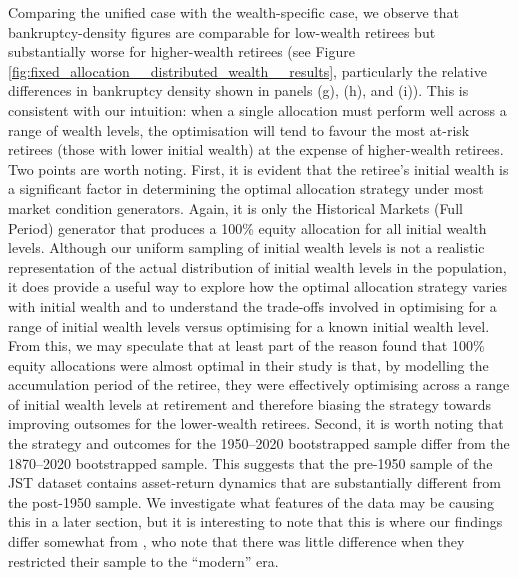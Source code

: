 \documentclass[11pt]{article}
\begin{document}
Comparing the unified case with the wealth-specific case, we observe that bankruptcy-density figures are comparable for low-wealth retirees but substantially worse for higher-wealth retirees (see Figure \ref{fig:fixed_allocation__distributed_wealth__results}, particularly the relative differences in bankruptcy density shown in panels (g), (h), and (i)). This is consistent with our intuition: when a single allocation must perform well across a range of wealth levels, the optimisation will tend to favour the most at-risk retirees (those with lower initial wealth) at the expense of higher-wealth retirees. Two points are worth noting. First, it is evident that the retiree's initial wealth is a significant factor in determining the optimal allocation strategy under most market condition generators. Again, it is only the Historical Markets (Full Period) generator that produces a 100\% equity allocation for all initial wealth levels. Although our uniform sampling of initial wealth levels is not a realistic representation of the actual distribution of initial wealth levels in the population, it does provide a useful way to explore how the optimal allocation strategy varies with initial wealth and to understand the trade-offs involved in optimising for a range of initial wealth levels versus optimising for a known initial wealth level. From this, we may speculate that at least part of the reason \textcite{anarkulova2025beyond} found that 100\% equity allocations were almost optimal in their study is that, by modelling the accumulation period of the retiree, they were effectively optimising across a range of initial wealth levels at retirement and therefore biasing the strategy towards improving outsomes for the lower-wealth retirees. Second, it is worth noting that the strategy and outcomes for the 1950--2020 bootstrapped sample differ from the 1870--2020 bootstrapped sample. This suggests that the pre-1950 sample of the JST dataset contains asset-return dynamics that are substantially different from the post-1950 sample. We investigate what features of the data may be causing this in a later section, but it is interesting to note that this is where our findings differ somewhat from \textcite{anarkulova2025beyond}, who note that there was little difference when they restricted their sample to the ``modern'' era.
\end{document}
